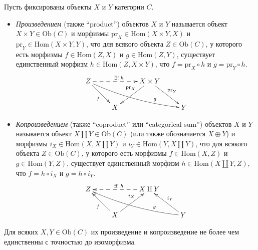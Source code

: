 \documentclass[12pt,a4paper]{article}
\newcommand{\Hom}{\mathrm{Hom}}
\newcommand{\Ob}{\mathrm{Ob}}
\newcommand{\pr}{\mathrm{pr}}
\begin{document}
    \begin{definition}
        Пусть фиксированы объекты $X$ и $Y$ категории $C$.
        \begin{itemize}
            \item \emph{Произведением} (также ``product'') объектов $X$ и $Y$ называется объект $X \times Y \in \Ob(C)$ и морфизмы $\pr_X \in \Hom(X \times Y, X)$ и $\pr_Y \in \Hom(X \times Y, Y)$, что для всякого объекта $Z \in \Ob(C)$, у которого есть морфизмы $f \in \Hom(Z, X)$ и $g \in \Hom(Z, Y)$, существует единственный морфизм $h \in \Hom(Z, X \times Y)$, что $f = \pr_X \circ h$ и $g = \pr_Y \circ h$.
                \[
                    \xymatrix{
                        Z \ar[rd]_{f} \ar@{-->}[rr]^{\exists!\; h} \ar@/_/[rrrd]^(.7){g} && X \times Y \ar[dl]_(0.4){\pr_X} \ar[dr]^{\pr_Y}\\
                        & X && Y
                    }
                \]
            \item \emph{Копроизведением} (также ``coproduct'' или ``categorical sum'') объектов $X$ и $Y$ называется объект $X \amalg Y \in \Ob(C)$ (или также обозначается $X \oplus Y$) и морфизмы $i_X \in \Hom(X, X \amalg Y)$ и $i_Y \in \Hom(Y, X \amalg Y)$, что для всякого объекта $Z \in \Ob(C)$, у которого есть морфизмы $f \in \Hom(X, Z)$ и $g \in \Hom(Y, Z)$, существует единственный морфизм $h \in \Hom(X \amalg Y, Z)$, что $f = h \circ i_X$ и $g = h \circ i_Y$.
                \[
                    \xymatrix{
                        Z && X \amalg Y \ar@{-->}[ll]_{\exists!\; h}\\
                        & X \ar[lu]^{f} \ar[ur]^(0.6){i_X} && Y \ar@/^/[lllu]_(.3){g} \ar[ul]_{i_Y}
                    }
                \]
        \end{itemize}
    \end{definition}

    \begin{lemma}
        Для всяких $X, Y \in \Ob(C)$ их произведение и копроизведение не более чем единственны с точностью до изоморфизма.
    \end{lemma}
\end{document}
